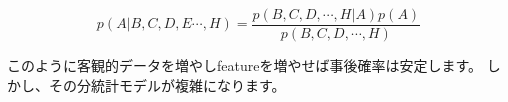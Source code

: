 \documentclass[dvipdfmx,cjk]{beamer} %
\theoremstyle{example}
\begin{document}
\begin{frame}
    $$p(A|B,C,D,E\cdots, H)= \displaystyle \frac{p(B, C, D,\cdots,H| A)p(A)}{p(B,C,D,\cdots,H)}$$
    
    このように客観的データを増やしfeatureを増やせば事後確率は安定します。
    しかし、その分統計モデルが複雑になります。
\end{frame}
\end{document}
